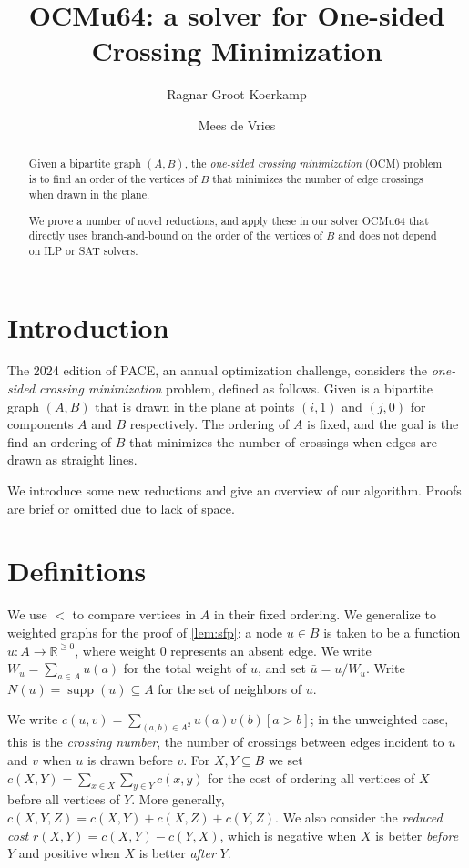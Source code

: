 \documentclass[a4paper,UKenglish,cleveref, autoref, thm-restate]{lipics-v2021}
\title{OCMu64: a solver for One-sided Crossing Minimization} %
\author{Ragnar {Groot Koerkamp}}{ETH Zurich, Switzerland}{ragnar.grootkoerkamp@gmail.com}{https://orcid.org/0000-0002-2091-1237}{}%
\author{Mees de Vries}{Unaffiliated, Netherlands}{meesdevries@protonmail.com}{}{}
\DeclareMathOperator{\supp}{supp}
\begin{document}
\maketitle

\begin{abstract}
  Given a bipartite graph $(A,B)$, the \emph{one-sided crossing minimization}
  (OCM) problem is to find an order of the vertices of $B$ that minimizes the
  number of edge crossings when drawn in the plane.

  We prove a number of novel reductions, and apply these in our solver OCMu64
  that directly uses branch-and-bound on the order of the vertices of $B$ and
  does not depend on ILP or SAT solvers.
\end{abstract}

\section{Introduction}

The 2024 edition of PACE, an annual optimization challenge, considers the
\emph{one-sided crossing minimization} problem, defined as follows.
Given is a bipartite graph $(A, B)$ that is drawn in the plane at points
$(i, 1)$ and $(j,0)$ for components $A$ and $B$ respectively. The ordering of $A$
is fixed, and the goal is the find an ordering of $B$ that minimizes the number of
crossings when edges are drawn as straight lines.

We introduce some new reductions and give an overview of our algorithm. Proofs are brief or
omitted due to lack of space.

\section{Definitions}
We use $<$ to compare vertices in $A$ in their fixed ordering. We generalize to weighted graphs
for the proof of \cref{lem:sfp}: a node $u \in B$ is taken to be a function $u: A \to \mathbb
R^{\geq 0}$, where weight 0 represents an absent edge. We write $W_u = \sum_{a \in A}u(a)$ for
the total weight of $u$, and set $\bar u = u/W_u$. Write $N(u) = \supp(u) \subseteq A$ for the
set of neighbors of $u$.

We write $c(u, v) = \sum_{(a, b) \in A^2}
u(a)v(b)[a > b]$; in the unweighted case, this is the \emph{crossing number}, the number of
crossings between edges incident to $u$ and $v$ when $u$ is drawn before $v$.  For
$X,Y\subseteq B$ we set $c(X,Y) = \sum_{x\in X}\sum_{y\in Y} c(x,y)$ for the cost of ordering
all vertices of $X$ before all vertices of $Y$. More generally, $c(X,Y,Z) = c(X, Y) + c(X, Z) +
c(Y, Z)$. We also consider the \emph{reduced cost} $r(X,Y) = c(X, Y) - c(Y, X)$, which is
negative when $X$ is better \emph{before} $Y$ and positive when $X$ is better \emph{after} $Y$.
\end{document}
